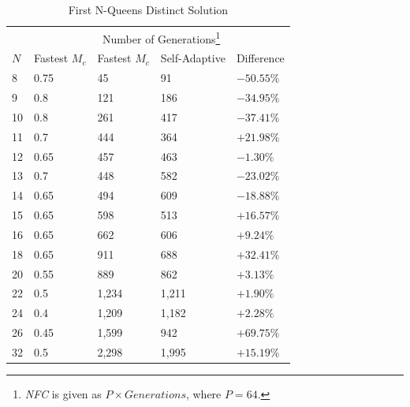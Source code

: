 \documentclass[conference]{IEEEtran}
\begin{document}
\begin{table}
\caption{First N-Queens Distinct Solution}
\begin{minipage}{\columnwidth}%
\centering
\renewcommand\footnoterule{ \kern -2ex}
\renewcommand{\thempfootnote}{\fnsymbol{mpfootnote}}
\begin{tabular}{|l|l|l|l|l|} \hline
&               &  \multicolumn{2}{c|}{Number of Generations\footnote{\emph{NFC} is given as $P \times Generations$, where $P = 64$.}}& \\ \cline{3-4}
$N$&    Fastest $M_{c}$&    Fastest $M_{c}$&   Self-Adaptive&    Difference\\ \hline
 8&     0.75&               45&                     91&                     $ -50.55\% $\\ \hline
 9&     0.8&                121&                    186&                    $ -34.95\% $\\ \hline
10&     0.8&                261&                    417&                    $ -37.41\% $\\ \hline
11&     0.7&                444&                    364&                    $ +21.98\% $\\ \hline
12&     0.65&               457&                    463&                    $ -1.30\%  $\\ \hline
13&     0.7&                448&                    582&                    $ -23.02\% $\\ \hline
14&     0.65&               494&                    609&                    $ -18.88\% $\\ \hline
15&     0.65&               598&                    513&                    $ +16.57\% $\\ \hline
16&     0.65&               662&                    606&                    $ +9.24\%  $\\ \hline
18&     0.65&               911&                    688&                    $ +32.41\% $\\ \hline
20&     0.55&               889&                    862&                    $ +3.13\%  $\\ \hline
22&     0.5&                1,234&                  1,211&                  $ +1.90\%  $\\ \hline
24&     0.4&                1,209&                  1,182&                  $ +2.28\%  $\\ \hline
26&     0.45&               1,599&                  942&                    $ +69.75\% $\\ \hline
32&     0.5&                2,298&                  1,995&                  $ +15.19\% $\\ \hline
\end{tabular}
\label{table:firstsol}
\end{minipage}
\end{table}
\end{document}
